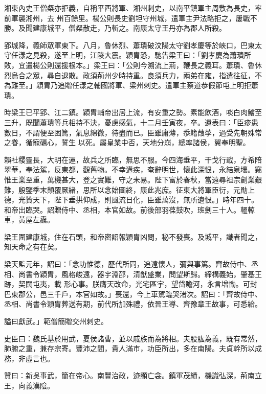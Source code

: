 \begin{pinyinscope}
 湘東內史王僧粲亦拒義，自稱平西將軍、湘州刺史，以南平鎮軍主周敷為長史，率前軍襲湘州，去
 州百餘里。楊公則長史劉坦守州城，遣軍主尹法略拒之，屢戰不勝。及聞建康城平，僧粲散走，乃斬之。南康太守王丹亦為郡人所殺。



 郢城降，義師眾軍東下。八月，魯休烈、蕭璝破汶陽太守劉孝慶等於峽口，巴東太守任漾之見殺，遂至上明，江陵大震。穎胄恐，馳告梁王曰：「劉孝慶為蕭璝所敗，宜遣楊公則還援根本。」梁王曰：「公則今溯流上荊，鞭長之義耳。蕭璝、魯休烈烏合之眾，尋自退散。政須荊州少時持重。良須兵力，兩弟在雍，指遣往征，不為難至。」穎胄乃追贈任漾之輔國將軍、梁州刺史。遣軍主蔡道恭假節屯上明拒蕭璝。



 時梁王已平郢、江二鎮。穎胄輔帝出居上流，有安重之勢。素能飲酒，啖白肉鱠至三升，既聞蕭璝等兵相持不決，憂慮感氣，十二月壬寅夜，卒。遺表曰：「臣疹患數日，不謂便至困篤，氣息綿微，待盡而已。臣雖庸薄，忝籍葭莩，過受先朝殊常之眷，循寵礪心，誓生
 以死。屬皇業中否，天地分崩，總率諸侯，翼奉明聖。



 賴社稷靈長，大明在運，故兵之所臨，無思不服。今四海垂平，干戈行戢，方希陪翠華，奉法駕，反東都，觀舊物。不幸遘疾，奄辭明世，懷此深恨，永結泉壤。竊惟王業至重，萬機甚大，登之實難，守之未易。陛下富於春秋，當遠尋祖宗創業艱難，殷鑒季末顛覆厥緒，思所以念始圖終，康此兆庶。征東大將軍臣衍，元勛上德，光贊天下，陛下垂拱仰成，則風流日化，臣雖萬沒，無所遺恨。」時年四十。和帝出臨哭。詔贈侍中、丞相，本官如故。前後部羽葆鼓吹，班劍三十人。轀輬車，黃屋左纛。



 梁王圍建康城，住在石頭，和帝密詔報穎胄凶問，秘不發喪。及城平，識者聞之，知天命之有在矣。



 梁天監元年，詔曰：「念功惟德，歷代所同，追遠懷人，彌與事篤。齊故侍中、丞相、尚書令穎胄，風格峻遠，器宇淵邵，清猷盛業，問望斯歸。締構義始，肇基王跡，契闊屯夷，載
 形心事。朕膺天改命，光宅區宇，望岱瞻河，永言增慟。可封巴東郡公，邑三千戶，本官如故。」喪還，今上車駕臨哭渚次。詔曰：「齊故侍中、丞相、尚書令穎胄葬送有期，前代所加殊禮，依晉王導、齊豫章王故事，可悉給。



 謚曰獻武。」範僧簡贈交州刺史。



 史臣曰：魏氏基於用武，夏侯諸曹，並以戚族而為將相。夫股肱為義，既有常然，肺腑之重，兼存宗寄。豐沛之間，貴人滿市，功臣所出，多在南陽。夫貞幹所以成務，非虛言也。



 贊曰：新吳事武，簡在帝心。南豐治政，迹顯亡衾。鎮軍茂績，機識弘深，荊南立王，向義漢陰。



\end{pinyinscope}